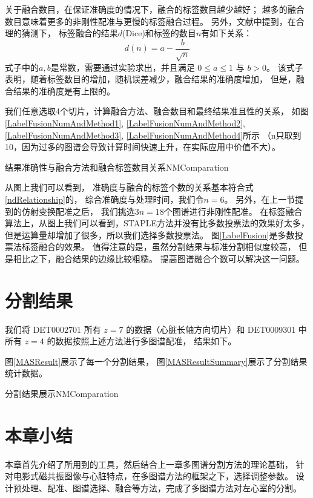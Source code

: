 关于融合数目，在保证准确度的情况下，融合的标签数目越少越好；
越多的融合数目意味着更多的非刚性配准与更慢的标签融合过程。
另外，文献\cite{HeckemannMultiClassifier2006}中提到，在合理的猜测下，
标签融合的结果$d$(Dice)和标签的数目$n$有如下关系：
\begin{equation}\label{ndRelationship}
  d(n)=a-\frac{b}{\sqrt{n}}
\end{equation}
式子中的$a,b$是常数，需要通过实验求出，并且满足 $0\le a\le 1$ 与 $b>0$。
该式子表明，随着标签数目的增加，随机误差减少，融合结果的准确度增加，
但是，融合结果的准确度是有上限的。

我们任意选取4个切片，计算融合方法、融合数目和最终结果准且性的关系，
如图\ref{LabelFusionNumAndMethod1}, \ref{LabelFusionNumAndMethod2},
\ref{LabelFusionNumAndMethod3}, \ref{LabelFusionNumAndMethod4}所示
（n只取到10，因为过多的图谱会导致计算时间快速上升，在实际应用中价值不大）。
\begin{pics}[htbp]{结果准确性与融合方法和融合标签数目关系}{NMComparation}
\end{pics}

从图上我们可以看到，
准确度与融合的标签个数的关系基本符合式\ref{ndRelationship}的，
综合准确度与处理时间，我们令$n=6$。
另外，在上一节提到的仿射变换配准之后，
我们挑选$3n=18$个图谱进行非刚性配准。
在标签融合算法上，从图上我们可以看到，STAPLE方法并没有比多数投票法的效果好太多，
但是运算量却增加了很多，所以我们选择多数投票法。
图\ref{LabelFusion}是多数投票法标签融合的效果。
值得注意的是，虽然分割结果与标准分割相似度较高，
但是相比之下，融合结果的边缘比较粗糙。
提高图谱融合个数可以解决这一问题。


\section{分割结果}
我们将 DET0002701 所有 $z=7$ 的数据（心脏长轴方向切片）和 
DET0009301 中所有 $z=4$ 的数据按照上述方法进行多图谱配准，
结果如下。

图\ref{MASResult}展示了每一个分割结果，
图\ref{MASResultSummary}展示了分割结果统计数据。
\begin{pics}[htbp]{分割结果展示}{NMComparation}
\end{pics}

\section{本章小结}
本章首先介绍了所用到的工具，然后结合上一章多图谱分割方法的理论基础，
针对电影式磁共振图像与心脏特点，在多图谱方法的框架之下，选择调整参数。
设计预处理、配准、图谱选择、融合等方法，完成了多图谱方法对左心室的分割。
